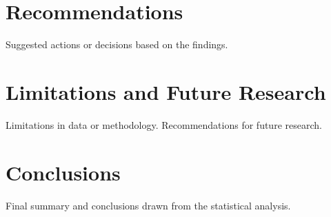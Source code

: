 \documentclass[12pt]{article}
\begin{document}

\section{Recommendations}

Suggested actions or decisions based on the findings.

\section{Limitations and Future Research}

Limitations in data or methodology.
Recommendations for future research.

\section{Conclusions}

Final summary and conclusions drawn from the statistical analysis.


\newpage
%
%

 
\end{document}
